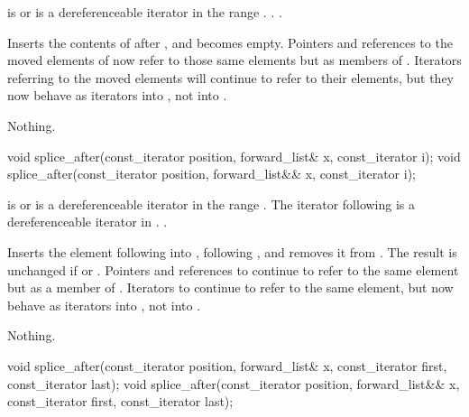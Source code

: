 \begin{itemdescr}
\pnum
\requires {} is  or is a dereferenceable
iterator in the range .
.
.

\pnum
\effects Inserts the contents of  after
, and  becomes empty. Pointers and references to the moved
elements of  now refer to those same elements but as members of .
Iterators referring to the moved elements will continue to refer to their elements, but
they now behave as iterators into , not into .

\pnum
\throws Nothing.

\pnum
\complexity {}
\end{itemdescr}

%
\begin{itemdecl}
void splice_after(const_iterator position, forward_list& x, const_iterator i);
void splice_after(const_iterator position, forward_list&& x, const_iterator i);
\end{itemdecl}

\begin{itemdescr}
\pnum
\requires {} is  or is a dereferenceable
iterator in the range .
The iterator following  is a dereferenceable iterator in .
.

\pnum
\effects Inserts the element following  into , following
, and removes it from .
The result is unchanged if  or . Pointers
and references to  continue to refer to the same element but as a member of
. Iterators to  continue to refer to
the same element, but now behave as iterators into , not into .

\pnum
\throws Nothing.

\pnum
\complexity {}
\end{itemdescr}

%
\begin{itemdecl}
void splice_after(const_iterator position, forward_list& x,
                  const_iterator first, const_iterator last);
void splice_after(const_iterator position, forward_list&& x,
                  const_iterator first, const_iterator last);
\end{itemdecl}

